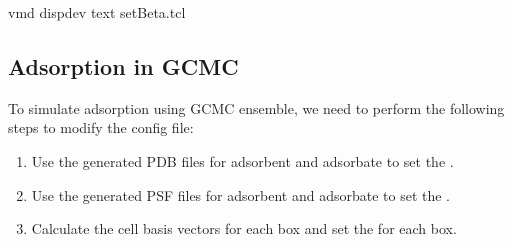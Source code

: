 \documentclass[letterpaper,10pt,english]{sphinxmanual}
\begin{document}
\begin{enumerate}
\begin{itemize}
\end{itemize}

\begin{sphinxVerbatim}[commandchars=\\\{\}]
vmd \PYGZhy{}dispdev text \PYGZlt{} setBeta.tcl
\end{sphinxVerbatim}

\end{enumerate}


\subsection{Adsorption in GCMC}
\label{\detokenize{howto:adsorption-in-gcmc}}
\sphinxAtStartPar
To simulate adsorption using GCMC ensemble, we need to perform the following steps to modify the config file:
\begin{enumerate}
%
\item {} 
\sphinxAtStartPar
Use the generated PDB files for adsorbent and adsorbate to set the .

\item {} 
\sphinxAtStartPar
Use the generated PSF files for adsorbent and adsorbate to set the .

\item {} 
\sphinxAtStartPar
Calculate the cell basis vectors for each box and set the  for each box.

\end{enumerate}
\end{document}
